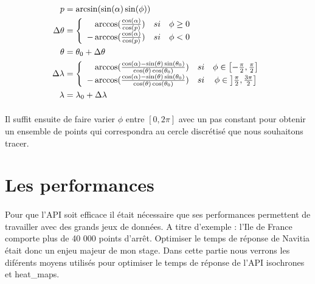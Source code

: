 \documentclass[a4paper]{report}
\begin{document}
\begin{align} 
	p&=\arcsin(\sin(\alpha)\sin(\phi)) \\
	\Delta \theta &= 
	\left \{
	\begin{array}{r c l}
		\arccos(\frac{\cos(\alpha)}{\cos(p)}) \quad si& \phi \ge 0 \\
		-\arccos(\frac{\cos(\alpha)}{\cos(p)}) \quad si& \phi < 0\\
	\end{array}
	\right. \\
	\theta &= \theta_{0} + \Delta \theta \\
	\Delta \lambda &= 
	\left \{
	\begin{array}{r c l}
		\arccos(\frac{\cos(\alpha) - \sin(\theta)\sin(\theta_0)}{\cos(\theta)\cos(\theta_0)}) \quad si& \phi \in \left[ -\frac{\pi}{2},\frac{\pi}{2} \right]\\
		-\arccos(\frac{\cos(\alpha) - \sin(\theta)\sin(\theta_0)}{\cos(\theta)\cos(\theta_0)}) \quad si& \phi \in \left] \frac{\pi}{2},\frac{3\pi}{2} \right]\\
	\end{array}
	\right. \\
	\lambda &= \lambda_{0} + \Delta \lambda 
\end{align}

\paragraph{} Il suffit ensuite de faire varier $\phi$ entre $\left[ 0, 2\pi \right]$ avec un pas constant pour obtenir un ensemble de points qui correspondra au cercle discrétisé que nous souhaitons tracer.

\section{Les performances}

\paragraph{}Pour que l'API soit efficace il était nécessaire que ses performances permettent de travailler avec des grands jeux de données. A titre d'exemple : l'Ile de France comporte plus de 40 000 points d'arrêt. Optimiser le temps de réponse de Navitia était donc un enjeu majeur de mon stage. Dans cette partie nous verrons les diférents moyens utilisés pour optimiser le temps de réponse de l'API isochrones et heat\_maps. 
\end{document}
